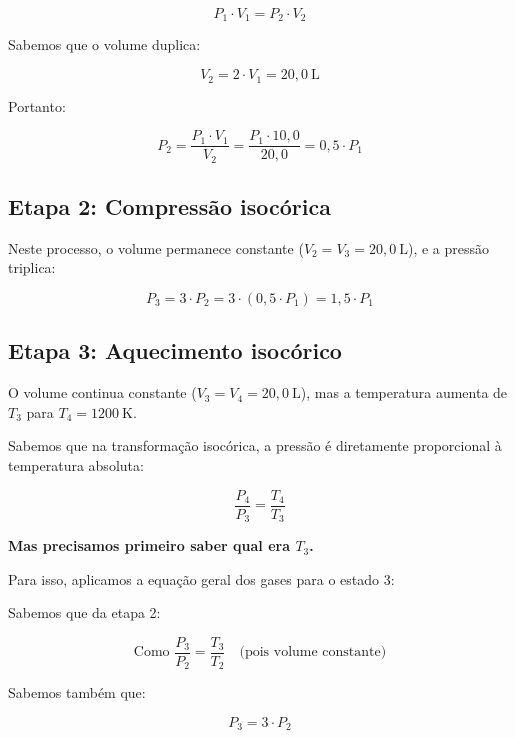 \documentclass[a4paper,12pt]{article}
\begin{document}
\begin{flushleft}
\begin{equation}
P_1 \cdot V_1 = P_2 \cdot V_2
\end{equation}

Sabemos que o volume duplica:

\begin{equation}
V_2 = 2 \cdot V_1 = 20,0 \ \text{L}
\end{equation}

Portanto:

\begin{equation}
P_2 = \frac{P_1 \cdot V_1}{V_2} = \frac{P_1 \cdot 10,0}{20,0} = 0,5 \cdot P_1
\end{equation}

\subsection*{Etapa 2: Compressão isocórica}

Neste processo, o volume permanece constante ($V_2 = V_3 = 20,0 \ \text{L}$), e a pressão triplica:

\begin{equation}
P_3 = 3 \cdot P_2 = 3 \cdot (0,5 \cdot P_1) = 1,5 \cdot P_1
\end{equation}

\subsection*{Etapa 3: Aquecimento isocórico}

O volume continua constante ($V_3 = V_4 = 20,0 \ \text{L}$), mas a temperatura aumenta de $T_3$ para $T_4 = 1200 \ \text{K}$.

Sabemos que na transformação isocórica, a pressão é diretamente proporcional à temperatura absoluta:

\begin{equation}
\frac{P_4}{P_3} = \frac{T_4}{T_3}
\end{equation}

\textbf{Mas precisamos primeiro saber qual era $T_3$.}

Para isso, aplicamos a equação geral dos gases para o estado 3:

Sabemos que da etapa 2:

\[
\text{Como } \frac{P_3}{P_2} = \frac{T_3}{T_2} \quad \text{(pois volume constante)}
\]

Sabemos também que:

\begin{equation}
P_3 = 3 \cdot P_2
\end{equation}


\end{flushleft}
\end{document}
